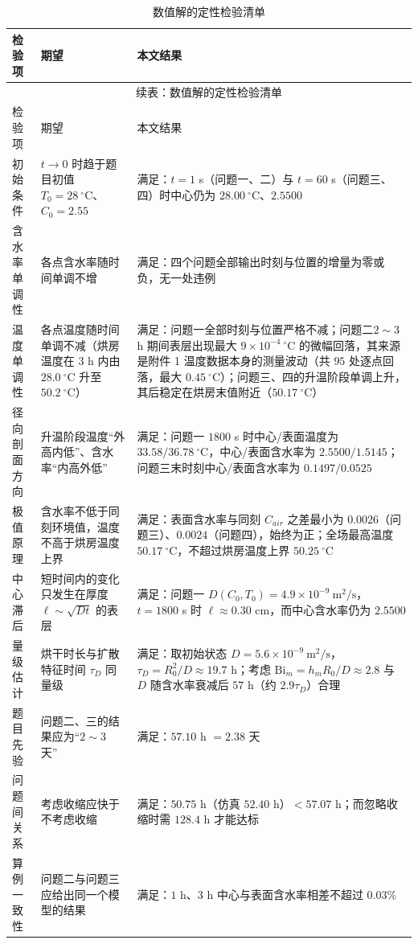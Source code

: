 \documentclass[12pt,a4paper]{article}
\begin{document}
{\small
\begin{longtable}{p{2.6cm}p{5.4cm}p{6.6cm}}
\caption{数值解的定性检验清单}
\label{tab:qualitative}\\
\toprule
检验项 & 期望 & 本文结果\\
\midrule
\endfirsthead

\multicolumn{3}{c}{\small 续表：数值解的定性检验清单}\\
\toprule
检验项 & 期望 & 本文结果\\
\midrule
\endhead

\bottomrule
\endlastfoot

初始条件 & $t\to0$ 时趋于题目初值 $T_0=28\ \mathrm{^\circ C}$、$C_0=2.55$ & 满足：$t=1$ s（问题一、二）与 $t=60$ s（问题三、四）时中心仍为 $28.00\ \mathrm{^\circ C}$、$2.5500$\\
含水率单调性 & 各点含水率随时间单调不增 & 满足：四个问题全部输出时刻与位置的增量为零或负，无一处违例\\
温度单调性 & 各点温度随时间单调不减（烘房温度在 $3$ h 内由 $28.0\ \mathrm{^\circ C}$ 升至 $50.2\ \mathrm{^\circ C}$） & 满足：问题一全部时刻与位置严格不减；问题二$2\sim3$ h 期间表层出现最大 $9\times10^{-4}\ \mathrm{^\circ C}$ 的微幅回落，其来源是附件 1 温度数据本身的测量波动（共 $95$ 处逐点回落，最大 $0.45\ \mathrm{^\circ C}$）；问题三、四的升温阶段单调上升，其后稳定在烘房末值附近（$50.17\ \mathrm{^\circ C}$）\\
径向剖面方向 & 升温阶段温度“外高内低”、含水率“内高外低” & 满足：问题一 $1800$ s 时中心/表面温度为 $33.58/36.78\ \mathrm{^\circ C}$，中心/表面含水率为 $2.5500/1.5145$；问题三末时刻中心/表面含水率为 $0.1497/0.0525$\\
极值原理 & 含水率不低于同刻环境值，温度不高于烘房温度上界 & 满足：表面含水率与同刻 $C_{air}$ 之差最小为 $0.0026$（问题三）、$0.0024$（问题四），始终为正；全场最高温度 $50.17\ \mathrm{^\circ C}$，不超过烘房温度上界 $50.25\ \mathrm{^\circ C}$\\
中心滞后 & 短时间内的变化只发生在厚度 $\ell\sim\sqrt{Dt}$ 的表层 & 满足：问题一 $D(C_0,T_0)=4.9\times10^{-9}\ \mathrm{m^2/s}$，$t=1800$ s 时 $\ell\approx0.30$ cm，而中心含水率仍为 $2.5500$\\
量级估计 & 烘干时长与扩散特征时间 $\tau_D$ 同量级 & 满足：取初始状态 $D=5.6\times10^{-9}\ \mathrm{m^2/s}$，$\tau_D=R_0^{2}/D\approx19.7$ h；考虑 $\mathrm{Bi}_m=h_mR_0/D\approx2.8$ 与 $D$ 随含水率衰减后 $57$ h（约 $2.9\tau_D$）合理\\
题目先验 & 问题二、三的结果应为“$2\sim3$ 天” & 满足：$57.10$ h $=2.38$ 天\\
问题间关系 & 考虑收缩应快于不考虑收缩 & 满足：$50.75$ h（仿真 $52.40$ h）$<57.07$ h；而忽略收缩时需 $128.4$ h 才能达标\\
算例一致性 & 问题二与问题三应给出同一个模型的结果 & 满足：$1$ h、$3$ h 中心与表面含水率相差不超过 $0.03\%$\\
\end{longtable}
}
\end{document}
